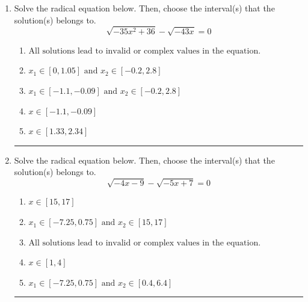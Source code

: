 \documentclass[14pt]{extbook}
\newcommand{\litem}[1]{\item#1\hspace*{-1cm}\rule{\textwidth}{0.4pt}}
\begin{document}
\begin{enumerate}
{\begin{enumerate}[label=\Alph*.]
\end{enumerate} }
\litem{
Solve the radical equation below. Then, choose the interval(s) that the solution(s) belongs to.\[ \sqrt{-35 x^2 + 36} - \sqrt{-43 x} = 0 \]\begin{enumerate}[label=\Alph*.]
\item \( \text{All solutions lead to invalid or complex values in the equation.} \)
\item \( x_1 \in [0, 1.05] \text{ and } x_2 \in [-0.2,2.8] \)
\item \( x_1 \in [-1.1, -0.09] \text{ and } x_2 \in [-0.2,2.8] \)
\item \( x \in [-1.1,-0.09] \)
\item \( x \in [1.33,2.34] \)

\end{enumerate} }
\litem{
Solve the radical equation below. Then, choose the interval(s) that the solution(s) belongs to.\[ \sqrt{-4 x - 9} - \sqrt{-5 x + 7} = 0 \]\begin{enumerate}[label=\Alph*.]
\item \( x \in [15,17] \)
\item \( x_1 \in [-7.25, 0.75] \text{ and } x_2 \in [15,17] \)
\item \( \text{All solutions lead to invalid or complex values in the equation.} \)
\item \( x \in [1,4] \)
\item \( x_1 \in [-7.25, 0.75] \text{ and } x_2 \in [0.4,6.4] \)


\end{enumerate}}
\end{enumerate}
\end{document}
